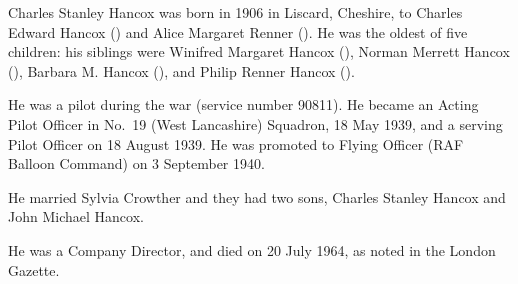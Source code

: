 
Charles Stanley Hancox was born in 1906 in Liscard, Cheshire, to Charles Edward Hancox () and Alice Margaret Renner ().\cite{CSHancoxBirth} He was the oldest of five children: his siblings were Winifred Margaret Hancox (), Norman Merrett Hancox (), Barbara M. Hancox (), and Philip Renner Hancox ().

He was a pilot during the war (service number 90811).
He became an Acting Pilot Officer in No.~19 (West Lancashire) Squadron, 18 May 1939, \cite{CSHancox1} and a serving Pilot Officer on 18 August 1939. \cite{CSHancox2}  He was promoted to Flying Officer (RAF Balloon Command) on 3 September 1940. \cite{CSHancox3}

He married Sylvia Crowther and they had two sons, Charles Stanley Hancox and John Michael Hancox.
	
He was a Company Director, and died on 20 July 1964, as noted in the London Gazette. \cite{CSHancoxDeath}
